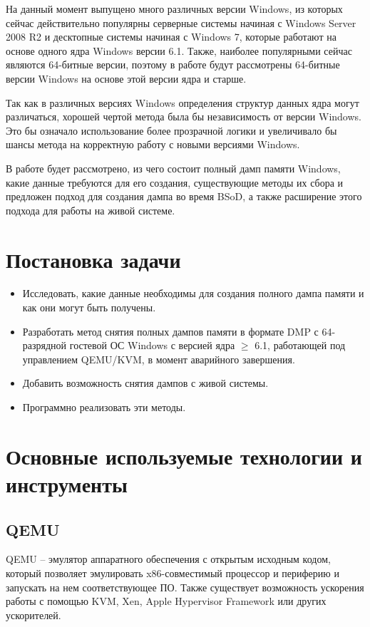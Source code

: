 \documentclass{mipt-thesis-bs}
\begin{document}
На данный момент выпущено много различных версии Windows, из которых сейчас действительно популярны серверные системы начиная с Windows Server 2008 R2 и десктопные системы начиная с Windows 7, которые работают на основе одного ядра Windows версии 6.1. Также, наиболее популярными сейчас являются 64-битные версии, поэтому в работе будут рассмотрены 64-битные версии Windows на основе этой версии ядра и старше.

Так как в различных версиях Windows определения структур данных ядра могут различаться, хорошей чертой метода была бы независимость от версии Windows. Это бы означало использование более прозрачной логики и увеличивало бы шансы метода на корректную работу с новыми версиями Windows.

В работе будет рассмотрено, из чего состоит полный дамп памяти Windows, какие данные требуются для его создания, существующие методы их сбора и предложен подход для создания дампа во время BSoD, а также расширение этого подхода для работы на живой системе.

\chapter{Постановка задачи}

\begin{itemize}
\item Исследовать, какие данные необходимы для создания полного дампа памяти и как они могут быть получены.
\item Разработать метод снятия полных дампов памяти в формате DMP с 64-разрядной гостевой ОС Windows с версией ядра $\geqslant$ 6.1, работающей под управлением QEMU/KVM, в момент аварийного завершения.
\item Добавить возможность снятия дампов с живой системы.
\item Программно реализовать эти методы.
\end{itemize}

\chapter{Основные используемые технологии и инструменты}

\section*{QEMU}

QEMU -- эмулятор аппаратного обеспечения с открытым исходным кодом, который позволяет эмулировать x86-совместимый процессор и периферию и запускать на нем соответствующее ПО. Также существует возможность ускорения работы с помощью KVM, Xen, Apple Hypervisor Framework или других ускорителей.
\end{document}

